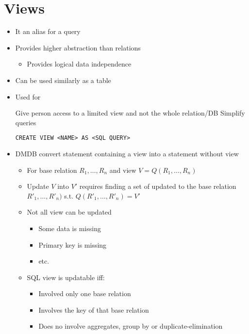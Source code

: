 
\section{Views}
\begin{itemize}
    \item It an alias for a query
    \item Provides higher abstraction than relations
        \begin{itemize}
            \item Provides logical data independence
        \end{itemize}
    \item Can be used similarly as a table
    \item Used for
        \begin{itemize}
             Give person access to a limited view and not the whole relation/DB
             Simplify queries
        \end{itemize}
     \verb+CREATE VIEW <NAME> AS <SQL QUERY>+
    \item DMDB convert statement containing a view into a statement without view
        \begin{itemize}
            \item For base relation $R_1, \dots , R_n$ and view $V = Q(R_1, \dots , R_n)$
            \item Update $V$ into $V'$ requires finding a set of updated to the base relation $R'_1, \dots ,R'_n)$ s.t. $Q(R'_1, \dots , R'_n) = V'$
            \item Not all view can be updated
                \begin{itemize}
                    \item Some data is missing
                    \item Primary key is missing
                    \item etc.
                \end{itemize}
            \item SQL view is updatable iff:
                \begin{itemize}
                    \item Involved only one base relation
                    \item Involves the key of that base relation
                    \item Does no involve aggregates, group by or duplicate-elimination
                \end{itemize}
        \end{itemize}
\end{itemize}
